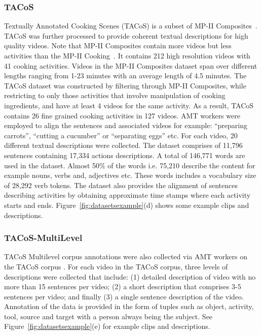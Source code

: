 \documentclass[10pt,journal,compsoc]{IEEEtran}
\begin{document}
\subsubsection{TACoS}
Textually Annotated Cooking Scenes (TACoS) is a subset of MP-II Composites~\cite{rohrbach2012script}. TACoS was further processed to provide coherent textual descriptions for high quality videos. Note that MP-II Composites contain more videos but less activities than the MP-II Cooking~\cite{rohrbach2012database}. It contains 212 high resolution videos with 41 cooking activities. Videos in the MP-II Composites dataset span over different lengths ranging from 1-23 minutes with an average length of 4.5 minutes. The TACoS dataset was constructed by filtering through MP-II Composites, while restricting to only those activities that involve manipulation of cooking ingredients, and have at least 4 videos for the same activity. As a result, TACoS contains 26 fine grained cooking activities in 127 videos. AMT workers were employed to align the sentences and associated videos for example: ``preparing carrots'', ``cutting a cucumber'' or ``separating eggs'' etc. For each video, 20 different textual descriptions were collected. The dataset comprises of 11,796 sentences containing 17,334 actions descriptions. A total of 146,771 words are used in the dataset. Almost 50\% of the words i.e. 75,210 describe the content for example nouns, verbs and, adjectives etc. These words includes a vocabulary size of 28,292 verb tokens. The dataset also provides the alignment of sentences describing activities by obtaining approximate time stamps where each activity starts and ends. Figure~\ref{fig:datasetsexample}(d) shows some example clips and descriptions.

\subsubsection{TACoS-MultiLevel}
TACoS Multilevel \cite{rohrbach2014coherent} corpus annotations were also collected via AMT workers on the TACoS corpus \cite{regneri2013grounding}. For each video in the TACoS corpus, three levels of descriptions were collected that include: (1) detailed description of video with no more than 15 sentences per video; (2) a short description that comprises 3-5 sentences per video; and finally (3) a single sentence description of the video. Annotation of the data is provided in the form of tuples such as object, activity, tool, source and target with a person always being the subject. See Figure~\ref{fig:datasetsexample}(e) for example clips and descriptions.
\end{document}
